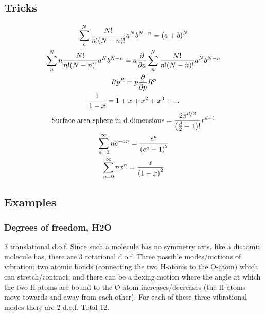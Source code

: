 \documentclass[a4paper, norsk, 8pt]{article}
\begin{document}
\begin{multicols*}{3}
\subsection*{\footnotesize  Tricks}
\begin{gather*}
  \sum_{n}^{N} \frac{N!}{n!(N-n)!}a^Nb^{N-n} = (a+b)^N \\
  \sum_{n}^{N} n\frac{N!}{n!(N-n)!}a^Nb^{N-n} = a\pdv{}{a}\sum_{n}^{N} \frac{N!}{n!(N-n)!}a^Nb^{N-n} \\
  Rp^{R} = p \pdv{}{p}R^{p} \\
  \frac{1}{1-x} = 1 + x + x^2 + x^3 +... \\
  \text{Surface area sphere in d dimensions} = \frac{2\pi^{d/2}}{\left( \frac{d}{2} - 1 \right)!}r^{d-1}\\
  \sum_{n=0}^{\infty} ne^{-an} = \frac{e^{a}}{\left(e^a-1\right)^2} \\
  \sum_{n=0}^{\infty} nx^n = \frac{x}{\left( 1-x \right)^2}
\end{gather*}

\subsection*{\footnotesize  Examples}
\subsubsection*{\scriptsize Degrees of freedom, H2O}
3 translational d.o.f.
Since such a molecule has no symmetry axis, like a diatomic molecule has, there are 3 rotational d.o.f.
Three possible modes/motions of vibration: two atomic bonds (connecting
the two H-atoms to the O-atom) which can stretch/contract, and there can
be a flexing motion where the angle at which the two H-atoms are bound to
the O-atom increases/decreases (the H-atoms move towards and away from
each other). For each of these three vibrational modes there are 2 d.o.f. Total $12$.


\end{multicols*}
\end{document}
